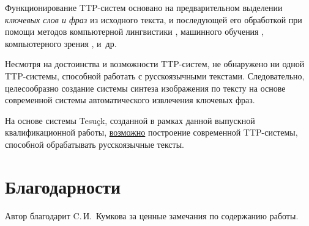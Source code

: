 Функционирование TTP-систем основано \cite{Zhu07} на
предварительном выделении \emph{ключевых слов и фраз} из
исходного текста, и последующей его обработкой при помощи методов
компьютерной лингвистики \cite{Manning99}, машинного обучения
\cite{Hastie08}, компьютерного зрения \cite{Forsyth02}, и\ др.

Несмотря на достоинства и возможности TTP-систем, не обнаружено
ни одной TTP-системы, способной работать с русскоязычными
текстами. Следовательно, целесообразно создание системы синтеза
изображения по тексту на основе современной системы автоматического
извлечения ключевых фраз.

На основе системы Tesuçk, созданной в рамках данной выпускной
квалификационной работы, \underline{возможно} построение современной
TTP-системы, способной обрабатывать русскоязычные тексты. 

\section*{Благодарности}
Автор благодарит C.\,И.~Кумкова за ценные замечания по содержанию
работы.
